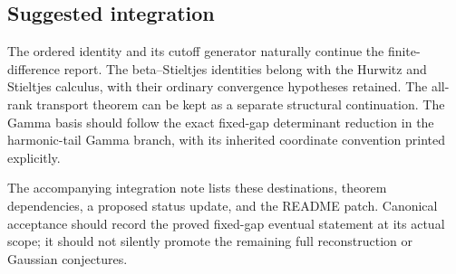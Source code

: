 \documentclass[11pt,a4paper]{article}
\numberwithin{equation}{section}
\theoremstyle{definition}
\theoremstyle{remark}
\begin{document}
\subsection{Suggested integration}

The ordered identity and its cutoff generator naturally continue
the finite-difference report. The beta--Stieltjes identities belong
with the Hurwitz and Stieltjes calculus, with their ordinary
convergence hypotheses retained. The all-rank transport theorem
can be kept as a separate structural continuation. The Gamma basis
should follow the exact fixed-gap determinant reduction in the
harmonic-tail Gamma branch, with its inherited coordinate convention
printed explicitly.

The accompanying integration note lists these destinations, theorem
dependencies, a proposed status update, and the README patch.
Canonical acceptance should record the proved fixed-gap eventual
statement at its actual scope; it should not silently promote the
remaining full reconstruction or Gaussian conjectures.
\end{document}
